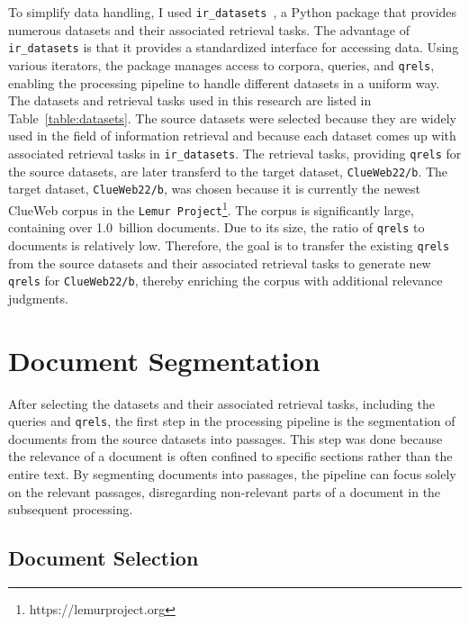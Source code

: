 To simplify data handling, I used \texttt{ir\_datasets}~\citep{macavaney:2021}, a Python package that provides numerous datasets and their associated retrieval tasks. The advantage of \texttt{ir\_datasets} is that it provides a standardized interface for accessing data. Using various iterators, the package manages access to corpora, queries, and \texttt{qrels}, enabling the processing pipeline to handle different datasets in a uniform way. The datasets and retrieval tasks used in this research are listed in Table~\ref{table:datasets}. The source datasets were selected because they are widely used in the field of information retrieval and because each dataset comes up with associated retrieval tasks in \texttt{ir\_datasets}. The retrieval tasks, providing \texttt{qrels} for the source datasets, are later transferd to the target dataset, \texttt{ClueWeb22/b}. The target dataset, \texttt{ClueWeb22/b}, was chosen because it is currently the newest ClueWeb corpus in the \texttt{Lemur Project}\footnote{https://lemurproject.org}. The corpus is significantly large, containing over 1.0~billion documents. Due to its size, the ratio of \texttt{qrels} to documents is relatively low. Therefore, the goal is to transfer the existing \texttt{qrels} from the source datasets and their associated retrieval tasks to generate new \texttt{qrels} for \texttt{ClueWeb22/b}, thereby enriching the corpus with additional relevance judgments. 


\section{Document Segmentation}\label{document-segmentation}

After selecting the datasets and their associated retrieval tasks, including the queries and \texttt{qrels}, the first step in the processing pipeline is the segmentation of documents from the source datasets into passages. This step was done because the relevance of a document is often confined to specific sections rather than the entire text. By segmenting documents into passages, the pipeline can focus solely on the relevant passages, disregarding non-relevant parts of a document in the subsequent processing.

\subsection{Document Selection}\label{selection-documents}

